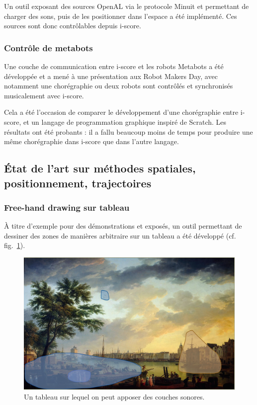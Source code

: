 \documentclass[french,12pt]{article}
\begin{document}
Un outil exposant des sources OpenAL via le protocole Minuit et permettant de charger des sons, puis de les positionner dans l'espace a été implémenté. Ces sources sont donc contrôlables depuis i-score.

\subsubsection{Contrôle de metabots}
Une couche de communication entre i-score et les robots Metabots
a été développée et a mené à une présentation aux Robot Makers Day, avec notamment 
une chorégraphie ou deux robots sont contrôlés et synchronisés musicalement avec i-score. 

Cela a été l'occasion de comparer le développement d'une chorégraphie entre i-score, et 
un langage de programmation graphique inspiré de Scratch. Les résultats ont été probants : il a fallu 
beaucoup moins de temps pour produire une même chorégraphie dans i-score que dans l'autre langage.


\subsection{État de l'art sur méthodes spatiales, positionnement, trajectoires}

\subsubsection{Free-hand drawing sur tableau}
À titre d'exemple pour des démonstrations et exposés, un outil permettant de dessiner des zones de manières arbitraire sur un tableau a été développé (cf. fig.~\ref{fig.tableau}).

\begin{figure}[h]
\centering
\includegraphics[scale=0.2]{images/harbour.png}
\caption{Un tableau sur lequel on peut apposer des couches sonores.}
\label{fig.tableau}
\end{figure} 
\end{document}
